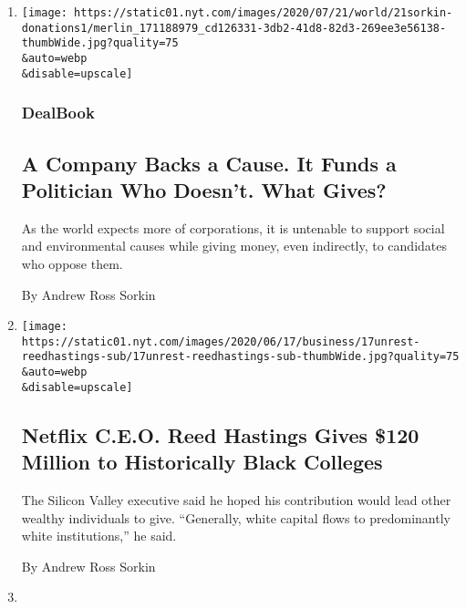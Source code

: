 \begin{enumerate}
\def\labelenumi{\arabic{enumi}.}
\item
  \href{/2020/07/21/business/dealbook/corporate-political-donations.html}{}

  \texttt{[image: https://static01.nyt.com/images/2020/07/21/world/21sorkin-donations1/merlin\_171188979\_cd126331-3db2-41d8-82d3-269ee3e56138-thumbWide.jpg?quality=75\\\&auto=webp\\\&disable=upscale]}

  \hypertarget{dealbook}{%
  \subsubsection{DealBook}\label{dealbook}}

  \hypertarget{a-company-backs-a-cause-it-funds-a-politician-who-doesnt-what-gives}{%
  \subsection{A Company Backs a Cause. It Funds a Politician Who
  Doesn't. What
  Gives?}\label{a-company-backs-a-cause-it-funds-a-politician-who-doesnt-what-gives}}

  As the world expects more of corporations, it is untenable to support
  social and environmental causes while giving money, even indirectly,
  to candidates who oppose them.

  By Andrew Ross Sorkin
\item
  \href{/2020/06/17/business/netflix-reed-hastings-hbcus.html}{}

  \texttt{[image: https://static01.nyt.com/images/2020/06/17/business/17unrest-reedhastings-sub/17unrest-reedhastings-sub-thumbWide.jpg?quality=75\\\&auto=webp\\\&disable=upscale]}

  \hypertarget{netflix-ceo-reed-hastings-gives-120-million-to-historically-black-colleges}{%
  \subsection{Netflix C.E.O. Reed Hastings Gives \$120 Million to
  Historically Black
  Colleges}\label{netflix-ceo-reed-hastings-gives-120-million-to-historically-black-colleges}}

  The Silicon Valley executive said he hoped his contribution would lead
  other wealthy individuals to give. ``Generally, white capital flows to
  predominantly white institutions,'' he said.

  By Andrew Ross Sorkin
\item
  \href{/2020/05/03/business/dealbook/warren-buffett-berkshire-hathaway.html}{}


\end{enumerate}
